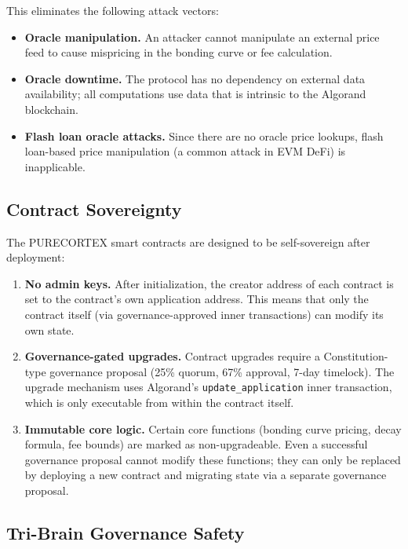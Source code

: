This eliminates the following attack vectors:
\begin{itemize}
  \item \textbf{Oracle manipulation.} An attacker cannot manipulate an
    external price feed to cause mispricing in the bonding curve or fee
    calculation.
  \item \textbf{Oracle downtime.} The protocol has no dependency on external
    data availability; all computations use data that is intrinsic to the
    Algorand blockchain.
  \item \textbf{Flash loan oracle attacks.} Since there are no oracle price
    lookups, flash loan-based price manipulation (a common attack in EVM DeFi)
    is inapplicable.
\end{itemize}

\subsection{Contract Sovereignty}
\label{subsec:sovereignty}

The PURECORTEX smart contracts are designed to be self-sovereign after deployment:

\begin{enumerate}
  \item \textbf{No admin keys.} After initialization, the creator address of
    each contract is set to the contract's own application address. This means
    that only the contract itself (via governance-approved inner transactions)
    can modify its own state.
  \item \textbf{Governance-gated upgrades.} Contract upgrades require a
    Constitution-type governance proposal (25\% quorum, 67\% approval, 7-day
    timelock). The upgrade mechanism uses Algorand's
    \texttt{update\_application} inner transaction, which is only executable
    from within the contract itself.
  \item \textbf{Immutable core logic.} Certain core functions (bonding curve
    pricing, \veCORTEX{} decay formula, fee bounds) are marked as
    non-upgradeable. Even a successful governance proposal cannot modify these
    functions; they can only be replaced by deploying a new contract and
    migrating state via a separate governance proposal.
\end{enumerate}

\subsection{Tri-Brain Governance Safety}
\label{subsec:tri-brain}


